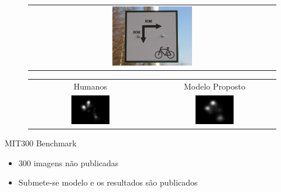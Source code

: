 \documentclass[10pt]{beamer}
\begin{document}
\begin{frame}{}
    \begin{figure}[hbt]
    \begin{center}
		\begin{tabular} {c}
		\includegraphics[width=0.33\textwidth]{./img/sign_s.jpg}
		\end{tabular}
    \end{center}
    \end{figure}
    \begin{figure}[hbt]
    \begin{center}
		\begin{tabular} {cc}
        Humanos & Modelo Proposto\\
        \includegraphics[width=0.33\textwidth]{./img/sign_gt.jpg} &
		\includegraphics[width=0.33\textwidth]{./img/sign_m.jpg}
		\end{tabular}
    \end{center}
    \end{figure}
\end{frame}

\begin{frame}{MIT300 Benchmark}
    \begin{itemize}[<+->]
        \item 300 imagens não publicadas
        \item Submete-se modelo e os resultados são publicados
    \end{itemize}
\end{frame}
\end{document}
